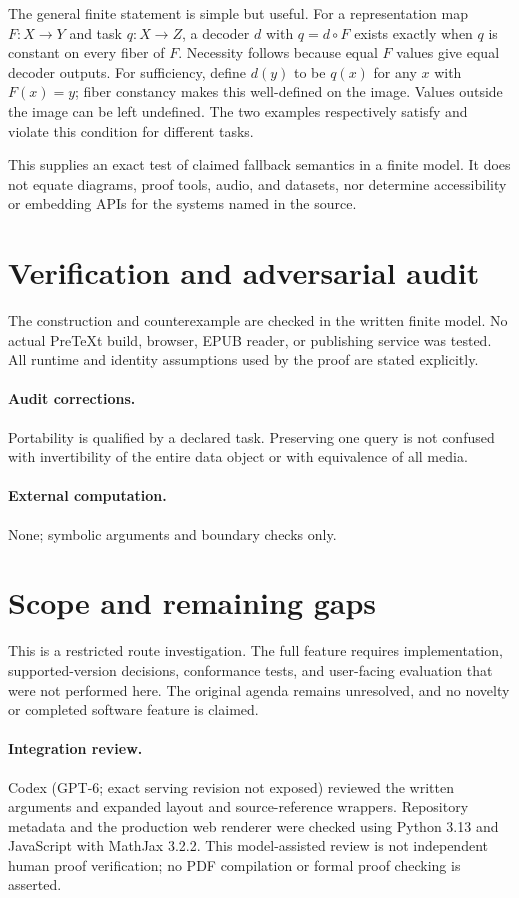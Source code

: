 \documentclass[11pt]{article}
\begin{document}
The general finite statement is simple but useful. For a representation map $F:X\to Y$ and task $q:X\to Z$, a decoder $d$ with $q=d\circ F$ exists exactly when $q$ is constant on every fiber of $F$. Necessity follows because equal $F$ values give equal decoder outputs. For sufficiency, define $d(y)$ to be $q(x)$ for any $x$ with $F(x)=y$; fiber constancy makes this well-defined on the image. Values outside the image can be left undefined. The two examples respectively satisfy and violate this condition for different tasks.

This supplies an exact test of claimed fallback semantics in a finite model. It does not equate diagrams, proof tools, audio, and datasets, nor determine accessibility or embedding APIs for the systems named in the source.
\section{Verification and adversarial audit}
The construction and counterexample are checked in the written finite model. No actual PreTeXt build, browser, EPUB reader, or publishing service was tested. All runtime and identity assumptions used by the proof are stated explicitly.
\paragraph{Audit corrections.} Portability is qualified by a declared task. Preserving one query is not confused with invertibility of the entire data object or with equivalence of all media.
\paragraph{External computation.} None; symbolic arguments and boundary checks only.
\section{Scope and remaining gaps}
This is a restricted route investigation. The full feature requires implementation, supported-version decisions, conformance tests, and user-facing evaluation that were not performed here. The original agenda remains unresolved, and no novelty or completed software feature is claimed.
\paragraph{Integration review.} Codex (GPT-6; exact serving revision not exposed) reviewed the written arguments and expanded layout and source-reference wrappers. Repository metadata and the production web renderer were checked using Python 3.13 and JavaScript with MathJax 3.2.2. This model-assisted review is not independent human proof verification; no PDF compilation or formal proof checking is asserted.
\end{document}
